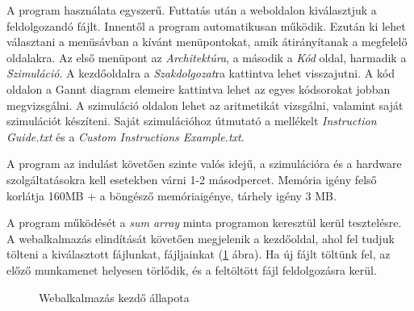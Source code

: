 
A program használata egyszerű. Futtatás után a weboldalon kiválasztjuk a feldolgozandó fájlt. Innentől a program automatikusan működik. Ezután ki lehet választani a menüsávban a kívánt menüpontokat, amik átirányítanak a megfelelő oldalakra. Az első menüpont az \textit{Architektúra}, a második a \textit{Kód} oldal, harmadik a \textit{Szimuláció}. A kezdőoldalra a \textit{Szakdolgozat}ra kattintva lehet visszajutni. A kód oldalon a Gannt diagram elemeire kattintva lehet az egyes kódsorokat jobban megvizsgálni. A szimuláció oldalon lehet az aritmetikát vizsgálni, valamint saját szimulációt készíteni. Saját szimulációhoz útmutató a mellékelt \textit{Instruction Guide.txt} és a \textit{Custom Instructions Example.txt}.

A program az indulást követően szinte valós idejű, a szimulációra és a hardware szolgáltatásokra kell esetekben várni 1-2 másodpercet. Memória igény felső korlátja 160MB + a böngésző memóriaigénye, tárhely igény 3 MB.

A program működését a \textit{sum array} minta programon keresztül kerül tesztelésre. A webalkalmazás elindítását követően megjelenik a kezdőoldal, ahol fel tudjuk tölteni a kiválasztott fájlunkat, fájljainkat (\ref{fig:start} ábra). Ha új fájlt töltünk fel, az előző munkamenet helyesen törlődik, és a feltöltött fájl feldolgozásra kerül.

\begin{figure}[h]
\centering
{}
\caption{Webalkalmazás kezdő állapota}
\label{fig:start}
\end{figure}



